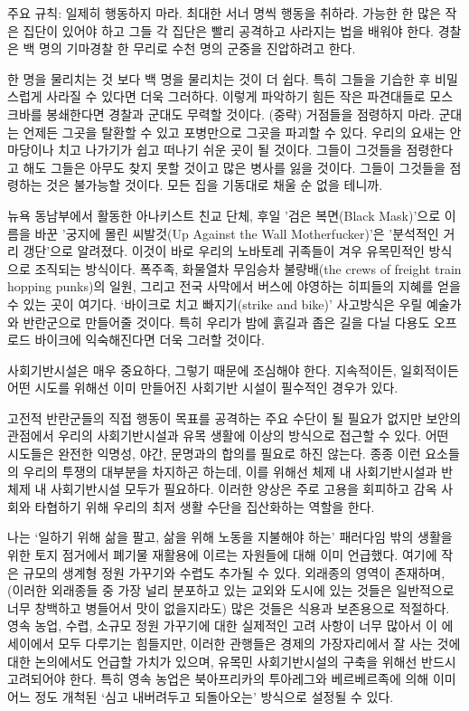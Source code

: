 \documentclass[11pt, b6paper, openany]{memoir}
\begin{document}
\begin{article}
    주요 규칙: 일제히 행동하지 마라. 최대한 서너 명씩 행동을 취하라. 가능한 한 많은 작은 집단이 있어야 하고 그들 각 집단은 빨리 공격하고 사라지는 법을 배워야 한다. 경찰은 백 명의 기마경찰 한 무리로 수천 명의 군중을 진압하려고 한다.

    한 명을 물리치는 것 보다 백 명을 물리치는 것이 더 쉽다. 특히 그들을 기습한 후 비밀스럽게 사라질 수 있다면 더욱 그러하다. 이렇게 파악하기 힘든 작은 파견대들로 모스크바를 봉쇄한다면 경찰과 군대도 무력할 것이다. (중략) 거점들을 점령하지 마라. 군대는 언제든 그곳을 탈환할 수 있고 포병만으로 그곳을 파괴할 수 있다. 우리의 요새는 안마당이나 치고 나가기가 쉽고 떠나기 쉬운 곳이 될 것이다. 그들이 그것들을 점령한다고 해도 그들은 아무도 찾지 못할 것이고 많은 병사를 잃을 것이다. 그들이 그것들을 점령하는 것은 불가능할 것이다. 모든 집을 기동대로 채울 순 없을 테니까. 

뉴욕 동남부에서 활동한 아나키스트 친교 단체, 후일 '검은 복면(Black Mask)'으로 이름을 바꾼 '궁지에 몰린 씨발것(Up Against the Wall Motherfucker)'은 '분석적인 거리 갱단'으로 알려졌다. 이것이 바로 우리의 노바토레 귀족들이 겨우 유목민적인 방식으로 조직되는 방식이다. 폭주족, 화물열차 무임승차 불량배(the crews of freight train hopping punks)의 일원, 그리고 전국 사막에서 버스에 야영하는 히피들의 지혜를 얻을 수 있는 곳이 여기다. ‘바이크로 치고 빠지기(strike and bike)’ 사고방식은 우릴 예술가와 반란군으로 만들어줄 것이다. 특히 우리가 밤에 흙길과 좁은 길을 다닐 다용도 오프로드 바이크에 익숙해진다면 더욱 그러할 것이다. 

사회기반시설은 매우 중요하다, 그렇기 때문에 조심해야 한다. 지속적이든, 일회적이든 어떤 시도를 위해선  이미 만들어진 사회기반 시설이 필수적인 경우가 있다.

고전적 반란군들의 직접 행동이 목표를 공격하는 주요 수단이 될 필요가 없지만 보안의 관점에서 우리의 사회기반시설과 유목 생활에 이상의 방식으로 접근할 수 있다. 어떤 시도들은 완전한 익명성, 야간, 문명과의 합의를 필요로 하진 않는다. 종종 이런 요소들의 우리의 투쟁의 대부분을 차지하곤 하는데, 이를 위해선 체제 내 사회기반시설과 반 체제 내 사회기반시설 모두가 필요하다. 이러한 양상은 주로 고용을 회피하고 감옥 사회와 타협하기 위해 우리의 최저 생활 수단을 집산화하는 역할을 한다.

나는 ‘일하기 위해 삶을 팔고, 삶을 위해 노동을 지불해야 하는’ 패러다임 밖의 생활을 위한 토지 점거에서 폐기물 재활용에 이르는 자원들에 대해 이미 언급했다. 여기에 작은 규모의 생계형 정원 가꾸기와 수렵도 추가될 수 있다. 외래종의 영역이 존재하며, (이러한 외래종들 중 가장 널리 분포하고 있는 교외와 도시에 있는 것들은 일반적으로 너무 창백하고 병들어서 맛이 없을지라도) 많은 것들은 식용과 보존용으로 적절하다. 영속 농업, 수렵, 소규모 정원 가꾸기에 대한 실제적인 고려 사항이 너무 많아서 이 에세이에서 모두 다루기는 힘들지만, 이러한 관행들은 경제의 가장자리에서 잘 사는 것에 대한 논의에서도 언급할 가치가 있으며, 유목민 사회기반시설의 구축을 위해선 반드시 고려되어야 한다. 특히 영속 농업은 북아프리카의 투아레그와 베르베르족에 의해 이미 어느 정도 개척된 ‘심고 내버려두고 되돌아오는’ 방식으로 설정될 수 있다.


\end{article}
\end{document}
